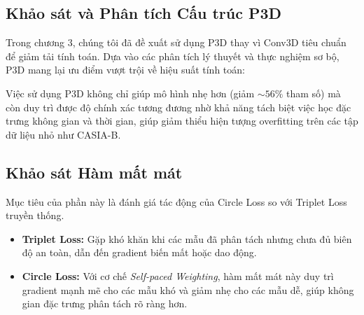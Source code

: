 \subsection{Khảo sát và Phân tích Cấu trúc P3D}
Trong chương 3, chúng tôi đã đề xuất sử dụng P3D thay vì Conv3D tiêu chuẩn để giảm tải tính toán. Dựa vào các phân tích lý thuyết và thực nghiệm sơ bộ, P3D mang lại ưu điểm vượt trội về hiệu suất tính toán:

\begin{table}[h]
    \centering
    \caption{So sánh giữa Conv3D và P3D-A về số lượng tham số và chi phí tính toán.}
\end{table}

Việc sử dụng P3D không chỉ giúp mô hình nhẹ hơn (giảm $\sim 56\%$ tham số) mà còn duy trì được độ chính xác tương đương nhờ khả năng tách biệt việc học đặc trưng không gian và thời gian, giúp giảm thiểu hiện tượng overfitting trên các tập dữ liệu nhỏ như CASIA-B.

\subsection{Khảo sát Hàm mất mát}
Mục tiêu của phần này là đánh giá tác động của Circle Loss so với Triplet Loss truyền thống.

\begin{itemize}
    \item \textbf{Triplet Loss:} Gặp khó khăn khi các mẫu đã phân tách nhưng chưa đủ biên độ an toàn, dẫn đến gradient biến mất hoặc dao động.
    \item \textbf{Circle Loss:} Với cơ chế \textit{Self-paced Weighting}, hàm mất mát này duy trì gradient mạnh mẽ cho các mẫu khó và giảm nhẹ cho các mẫu dễ, giúp không gian đặc trưng phân tách rõ ràng hơn.
\end{itemize}

